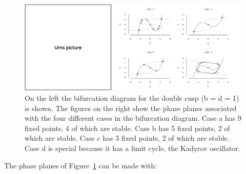 \documentclass[
  a4paper,
  DIV=11,
  numbers=noendperiod,
  oneside]{scrreprt}
\begin{document}
\begin{figure}

{\centering \includegraphics{media/ch4n/fig-ch4n-img16-old-64.png}

}

\caption{\label{fig-ch4n-img16-old-64}On the left the bifurcation
diagram for the double cusp (b = d = 1) is shown. The figures on the
right show the phase planes associated with the four different cases in
the bifurcation diagram. Case a has 9 fixed points, 4 of which are
stable. Case b has 5 fixed points, 2 of which are stable. Case c has 3
fixed points, 2 of which are stable. Case d is special because it has a
limit cycle, the Kadyrov oscillator.}

\end{figure}

The phase planes of Figure~\ref{fig-ch4n-img16-old-64} can be made with:
\end{document}
